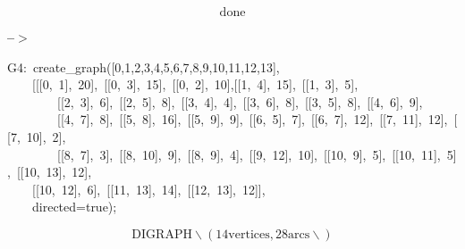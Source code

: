 \documentclass[fleqn]{article}
\begin{document}
\[\tag{\% o42} 
\ensuremath{\mathrm{done}}\mbox{}
\]


\noindent
\begin{minipage}[t]{4.000000em}\color{red}\bfseries
 --\ensuremath{\ensuremath{>}}	
\end{minipage}
\begin{minipage}[t]{\textwidth}\color{blue}
G4:\ create\_graph([0,1,2,3,4,5,6,7,8,9,10,11,12,13],\\
\ \ \ \ [[[0,\ 1],\ 20],\ [[0,\ 3],\ 15],\ [[0,\ 2],\ 10],[[1,\ 4],\ 15],\ [[1,\ 3],\ 5],\\
\ \ \ \ \ \ \ \ [[2,\ 3],\ 6],\ [[2,\ 5],\ 8],\ [[3,\ 4],\ 4],\ [[3,\ 6],\ 8],\ [[3,\ 5],\ 8],\ [[4,\ 6],\ 9],\ \\
\ \ \ \ \ \ \ \ [[4,\ 7],\ 8],\ [[5,\ 8],\ 16],\ [[5,\ 9],\ 9],\ [[6,\ 5],\ 7],\ [[6,\ 7],\ 12],\ [[7,\ 11],\ 12],\ [[7,\ 10],\ 2],\\
\ \ \ \ \ \ \ \ [[8,\ 7],\ 3],\ [[8,\ 10],\ 9],\ [[8,\ 9],\ 4],\ [[9,\ 12],\ 10],\ [[10,\ 9],\ 5],\ [[10,\ 11],\ 5],\ [[10,\ 13],\ 12],\\
\ \ \ \ [[10,\ 12],\ 6],\ [[11,\ 13],\ 14],\ [[12,\ 13],\ 12]],\\
\ \ \ \ directed=true);
\end{minipage}
\[\displaystyle \tag{G4} 
\ensuremath{\mathrm{DIGRAPH\backslash (14 vertices, 28 arcs\backslash )}}\mbox{}
\]
\end{document}
